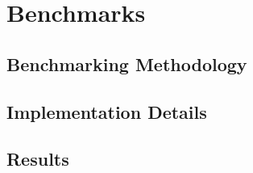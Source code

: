 \chapter{Benchmarks}\label{chapter:benchmarks}

\section{Benchmarking Methodology}
\section{Implementation Details}
\section{Results}